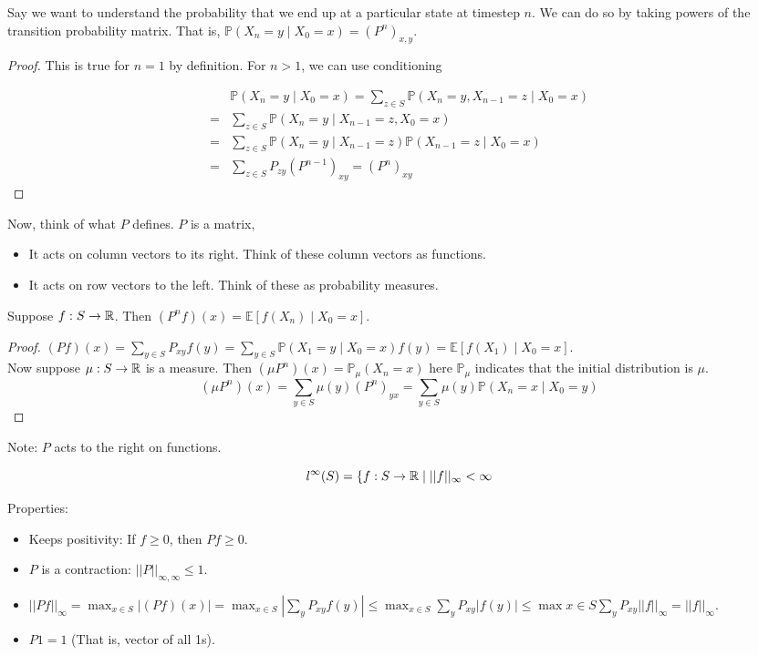 \documentclass[english, course]{Notes}
\begin{document}
Say we want to understand the probability that we end up at a particular state at timestep $n$. We can do so by taking powers of the transition probability matrix. That is, $\mathbb{P}(X_n = y \mid X_0 = x) = (P^n)_{x, y}$.

\begin{proof}
This is true for $n=1$ by definition. For $n > 1$, we can use conditioning

\begin{align*}
&\mathbb{P}(X_n = y \mid X_0 = x) = \sum_{z \in S} \mathbb{P}(X_n = y, X_{n-1} = z \mid X_0 = x)\\
=&\sum_{z \in S} \mathbb{P}(X_n = y \mid X_{n-1} = z, X_0 = x)\\
=& \sum_{z \in S} \mathbb{P}(X_n = y \mid X_{n-1} = z) \mathbb{P}(X_{n-1} = z \mid X_0 = x)\\
=& \sum_{z \in S} P_{zy}(P^{n-1})_{xy} = (P^n)_{xy}
\end{align*}
\end{proof}

Now, think of what $P$ defines. $P$ is a matrix,

\begin{itemize}
	\item It acts on column vectors to its right. Think of these column vectors as functions.
	\item It acts on row vectors to the left. Think of these as probability measures. 
\end{itemize}

Suppose $f: S \to \mathbb{R}$. Then $(P^n f)(x) = \mathbb{E}[f(X_n) \mid X_0 = x]$.

\begin{proof}
$(Pf)(x) = \sum_{y \in S} P_{xy} f(y) = \sum_{y \in S} \mathbb{P}(X_1 = y \mid X_0 = x)f(y) = \mathbb{E}[f(X_1) \mid X_0 = x]$.\\

Now suppose $\mu: S \to \mathbb{R}$ is a measure. Then $(\mu P^n)(x) = \mathbb{P}_\mu(X_n = x)$ here $\mathbb{P}_\mu$ indicates that the initial distribution is $\mu$.\\

\[(\mu P^n)(x) = \sum_{y \in S} \mu(y)(P^n)_{yx} = \sum_{y \in S} \mu(y) \mathbb{P}(X_n = x \mid X_0 = y)\]
\end{proof}

Note: $P$ acts to the right on functions.

\[l^\infty(S) = \{f: S \to \mathbb{R} \mid ||f||_\infty < \infty\]

Properties:
\begin{itemize}
	\item Keeps positivity: If $f \geq 0$, then $Pf \geq 0$.\\
	\item $P$ is a contraction: $||P||_{\infty, \infty} \leq 1$.\\
	\item $||Pf||_\infty = \max_{x \in S}|(Pf)(x)| = \max_{x \in S} |\sum_y P_{xy} f(y)| \leq \max_{x \in S} \sum_y P_{xy}|f(y)| \leq \max{x \in S} \sum_y P_{xy} ||f||_\infty = ||f||_\infty$.
	\item $P 1 = 1$ (That is, vector of all 1s).
\end{itemize}
\end{document}
